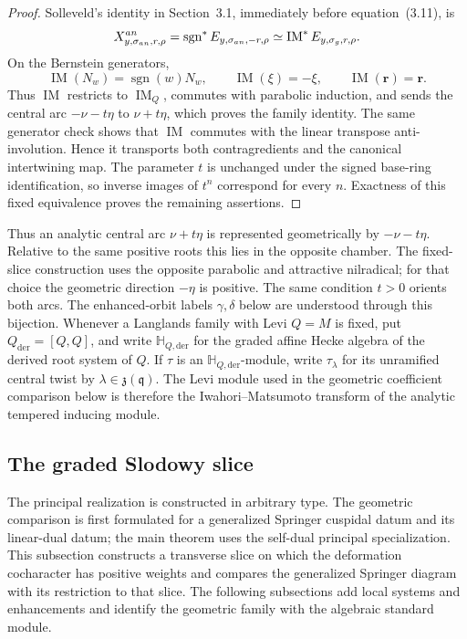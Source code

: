 \documentclass[10pt,a4paper]{amsart}
\newcommand{\Hh}{\mathbb H}
\begin{document}
\begin{proof}
Solleveld's identity in Section~3.1, immediately before equation~(3.11), is
\[
 X^{\rm an}_{y,\sigma_{\rm an},r,\rho}
 =\operatorname{sgn}^{*}E_{y,\sigma_{\rm an},-r,\rho}
 \simeq \operatorname{IM}^{*}E_{y,\sigma_{\rm g},r,\rho}.
\]
On the Bernstein generators,
\[
 \operatorname{IM}(N_w)=\operatorname{sgn}(w)N_w,\qquad
 \operatorname{IM}(\xi)=-\xi,\qquad
 \operatorname{IM}(\mathbf r)=\mathbf r.
\]
Thus $\operatorname{IM}$ restricts to $\operatorname{IM}_Q$, commutes with
parabolic induction, and sends the central arc $-\nu-t\eta$ to
$\nu+t\eta$, which proves the family identity.  The same generator check
shows that $\operatorname{IM}$ commutes with the linear transpose
anti-involution.  Hence it transports both contragredients and the canonical
intertwining map.  The parameter $t$ is unchanged under the signed
base-ring identification, so inverse images of $t^n$ correspond for every
$n$.  Exactness of this fixed equivalence proves the remaining assertions.
\end{proof}

Thus an analytic central arc $\nu+t\eta$ is represented geometrically by
$-\nu-t\eta$.  Relative to the same positive roots this lies in the opposite
chamber.  The fixed-slice construction uses the opposite parabolic and
attractive nilradical; for that choice the geometric direction $-\eta$
is positive.  The same condition $t>0$ orients both arcs.  The enhanced-orbit
labels $\gamma,\delta$ below are understood through this bijection.  Whenever
a Langlands family with Levi $Q=M$ is fixed, put
$Q_{\mathrm{der}}=[Q,Q]$, and write $\Hh_{Q,\mathrm{der}}$ for the graded
affine Hecke algebra of the derived root system of $Q$.  If $\tau$ is an
$\Hh_{Q,\mathrm{der}}$-module, write $\tau_\lambda$ for its unramified
central twist by $\lambda\in\mathfrak z(\mathfrak q)$.  The Levi module used
in the geometric coefficient comparison below is therefore the
Iwahori--Matsumoto transform of the analytic tempered inducing module.

\subsection{The graded Slodowy slice}
\label{sec:graded-slodowy-slice}

The principal realization is constructed in arbitrary type.  The geometric
comparison is first formulated for a generalized Springer cuspidal datum and
its linear-dual datum; the main theorem uses the self-dual principal
specialization.  This subsection constructs a transverse slice on which the
deformation cocharacter has positive weights and compares the generalized
Springer diagram with its restriction to that slice.  The following
subsections add local systems and enhancements and identify the geometric
family with the algebraic standard module.
\end{document}
